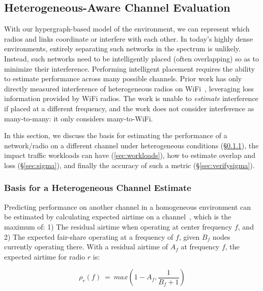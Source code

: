 
\subsection{Heterogeneous-Aware Channel Evaluation}
\label{sec:hce}
\label{sec:metric}

With our hypergraph-based model of the environment, we can represent which radios and links coordinate or interfere with each other. In today's highly dense environments, entirely separating such networks in the spectrum is unlikely.  Instead, such networks need to be intelligently placed (often overlapping) so as to minimize their interference.  Performing intelligent placement requires the ability to estimate performance across many possible channels.  Prior work has only directly measured interference of heterogeneous radios on WiFi~\cite{wifinet}, leveraging loss information provided by WiFi radios.  The work is unable to \emph{estimate} interference if placed at a different frequency, and the work does not consider interference as many-to-many: it only considers many-to-WiFi.

In this section, we discuss the basis for estimating the performance of a network/radio on a different channel under heterogeneous conditions (\S\ref{sec:deriveest}), the impact traffic workloads can have (\ref{sec:workloads}), how to estimate overlap and loss (\S\ref{sec:sigma}), and finally the accuracy of such a metric (\S\ref{sec:verifysigma}). 

\subsubsection{Basis for a Heterogeneous Channel Estimate}
\label{sec:deriveest}

Predicting performance on another channel in a homogeneous environment can be estimated by calculating expected airtime on a channel~\cite{whitefi}, which is the maximum of:  1) The residual airtime when operating at center frequency $f$, and 2) The expected fair-share operating at a frequency of $f$, given $B_{f}$ nodes currently operating there.  With a residual airtime of $A_f$ at frequency $f$, the expected airtime for radio $r$ is:


\vspace{-0.15in}
\begin{equation}
\label{eq:homo_airtime} 
\rho_r(f)~=~max(1 - A_f, \frac{1}{B_f + 1})
\end{equation}


